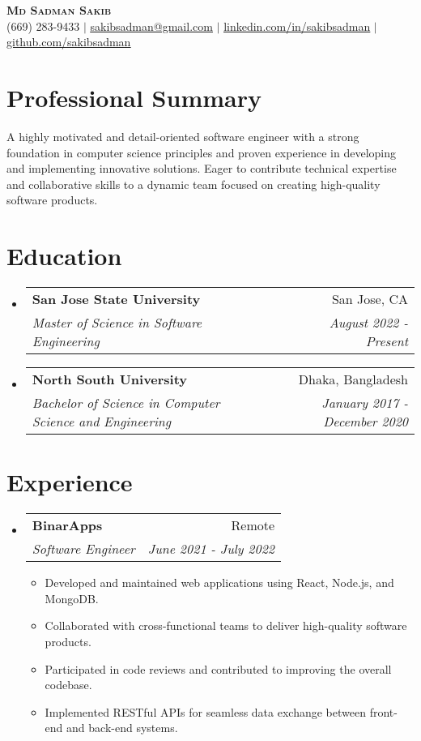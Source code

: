 \documentclass[letterpaper,11pt]{article}
\makeatletter
\newcommand{\resumeItem}[1]{
\item\small{
{#1 \vspace{-2pt}}
}
}
\newcommand{\resumeSubheading}[4]{
\vspace{-2pt}\item
\begin{tabular*}{0.97\textwidth}[t]{l@{\extracolsep{\fill}}r}
\textbf{#1} & #2 \\
\textit{\small#3} & \textit{\small #4} \\
\end{tabular*}\vspace{-7pt}
}
\newcommand{\resumeSubHeadingListStart}{\begin{itemize}[leftmargin=0.15in, label={}]}
\newcommand{\resumeSubHeadingListEnd}{\end{itemize}}
\newcommand{\resumeItemListStart}{\begin{itemize}}
\newcommand{\resumeItemListEnd}{\end{itemize}\vspace{-5pt}}
\makeatother
\begin{document}
\begin{center}
\textbf{\Huge \scshape Md Sadman Sakib} \\ \vspace{1pt}
\small (669) 283-9433 $|$ \href{mailto:sakibsadman@gmail.com}{\underline{sakibsadman@gmail.com}} $|$
\href{https://www.linkedin.com/in/sakibsadman/}{\underline{linkedin.com/in/sakibsadman}} $|$
\href{https://github.com/sakibsadman}{\underline{github.com/sakibsadman}}
\end{center}


\section{Professional Summary} %
A highly motivated and detail-oriented software engineer with a strong foundation in computer science principles and proven experience in developing and implementing innovative solutions. Eager to contribute technical expertise and collaborative skills to a dynamic team focused on creating high-quality software products.

\section{Education}
\resumeSubHeadingListStart
\resumeSubheading{San Jose State University}{San Jose, CA}{Master of Science in Software Engineering}{August 2022 - Present}
\resumeSubheading{North South University}{Dhaka, Bangladesh}{Bachelor of Science in Computer Science and Engineering}{January 2017 - December 2020}
\resumeSubHeadingListEnd

\section{Experience}
\resumeSubHeadingListStart
\resumeSubheading{BinarApps}{Remote}{Software Engineer}{June 2021 - July 2022}
\resumeItemListStart
\resumeItem{Developed and maintained web applications using React, Node.js, and MongoDB.}
\resumeItem{Collaborated with cross-functional teams to deliver high-quality software products.}
\resumeItem{Participated in code reviews and contributed to improving the overall codebase.}
\resumeItem{Implemented RESTful APIs for seamless data exchange between front-end and back-end systems.}
\resumeItemListEnd
\resumeSubHeadingListEnd
\end{document}
